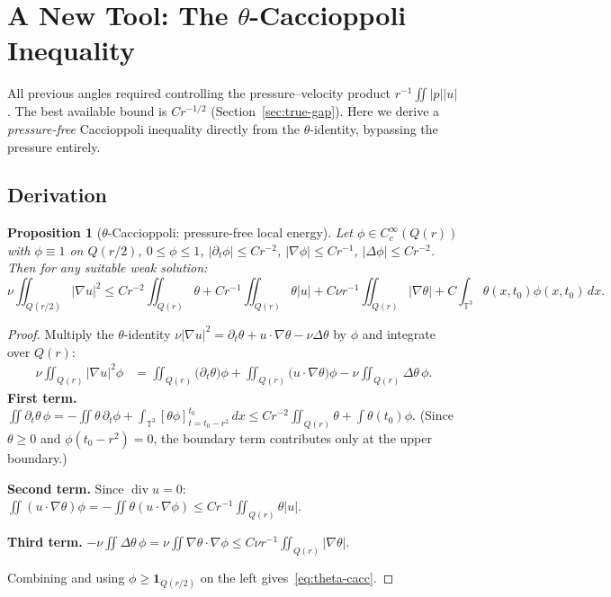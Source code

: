 \documentclass[11pt]{article}
\newtheorem{proposition}[theorem]{Proposition}
\theoremstyle{definition}
\theoremstyle{remark}
\newcommand{\T}{\mathbb{T}}
\newcommand{\grad}{\nabla}
\newcommand{\divg}{\operatorname{div}}
\newcommand{\dx}{\,dx}
\begin{document}
\section{A New Tool: The $\theta$-Caccioppoli Inequality}
\label{sec:theta-cacc}

All previous angles required controlling the pressure--velocity product
$r^{-1}\iint|p||u|$.  The best available bound is $Cr^{-1/2}$ (Section~\ref{sec:true-gap}).
Here we derive a \emph{pressure-free} Caccioppoli inequality directly from
the $\theta$-identity, bypassing the pressure entirely.

\subsection{Derivation}

\begin{proposition}[$\theta$-Caccioppoli: pressure-free local energy]\label{prop:theta-cacc}
  Let $\phi\in C_c^\infty(Q(r))$ with $\phi\equiv 1$ on $Q(r/2)$,
  $0\leq\phi\leq 1$, $|\partial_t\phi|\leq Cr^{-2}$,
  $|\grad\phi|\leq Cr^{-1}$, $|\Delta\phi|\leq Cr^{-2}$.
  Then for any suitable weak solution:
  \begin{equation}\label{eq:theta-cacc}
    \nu\iint_{Q(r/2)}|\grad u|^2
    \leq C r^{-2}\iint_{Q(r)}\theta
      + Cr^{-1}\iint_{Q(r)}\theta|u|
      + C\nu r^{-1}\iint_{Q(r)}|\grad\theta|
      + C\int_{\T^3}\theta(x,t_0)\phi(x,t_0)\dx.
  \end{equation}
\end{proposition}

\begin{proof}
  Multiply the $\theta$-identity
  $\nu|\grad u|^2 = \partial_t\theta + u\cdot\grad\theta - \nu\Delta\theta$
  by $\phi$ and integrate over $Q(r)$:
  \begin{align}
    \nu\iint_{Q(r)}|\grad u|^2\phi
    &= \iint_{Q(r)}\bigl(\partial_t\theta\bigr)\phi
      + \iint_{Q(r)}\bigl(u\cdot\grad\theta\bigr)\phi
      - \nu\iint_{Q(r)}\Delta\theta\,\phi.\label{eq:theta-id-tested}
  \end{align}
  \textbf{First term.}
  $\iint\partial_t\theta\,\phi = -\iint\theta\,\partial_t\phi
    + \int_{\T^3}[\theta\phi]_{t=t_0-r^2}^{t_0}\,dx
  \leq Cr^{-2}\iint_{Q(r)}\theta + \int\theta(t_0)\phi.$
  (Since $\theta\geq 0$ and $\phi(t_0-r^2)=0$, the boundary term
  contributes only at the upper boundary.)

  \textbf{Second term.}
  Since $\divg u=0$: $\iint(u\cdot\grad\theta)\phi
  = -\iint\theta(u\cdot\grad\phi) \leq Cr^{-1}\iint_{Q(r)}\theta|u|.$

  \textbf{Third term.}
  $-\nu\iint\Delta\theta\,\phi = \nu\iint\grad\theta\cdot\grad\phi
  \leq C\nu r^{-1}\iint_{Q(r)}|\grad\theta|.$

  Combining and using $\phi\geq\mathbf{1}_{Q(r/2)}$ on the left gives~\eqref{eq:theta-cacc}.
\end{proof}
\end{document}
